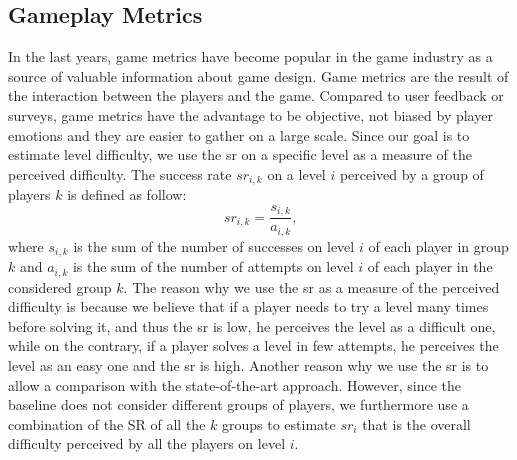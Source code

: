 \subsection{Gameplay Metrics}
In the last years, game metrics have become popular in the game industry as a source of valuable information about game design. Game metrics are the result of the interaction between the players and the game. Compared to user feedback or surveys, game metrics have the advantage to be objective, not biased by player emotions and they are easier to gather on a large scale. Since our goal is to estimate level difficulty, we use the \acs{sr} on a specific level as a measure of the perceived difficulty. The success rate $sr_{i,k}$ on a level $i$ perceived by a group of players $k$ is defined as follow:
\begin{equation}
 sr_{i,k}= \frac{s_{i,k}}{a_{i,k}} \text{,}
\end{equation}
 \label{eq:sucess_rate}
where $s_{i,k}$ is the sum of the number of successes on level $i$ of each player in group $k$ and $a_{i,k}$ is the sum of the number of attempts on level $i$ of each player in the considered group $k$. The reason why we use the \acs{sr} as a measure of the perceived difficulty is because we believe that if a player needs to try a level many times before solving it, and thus the \acs{sr} is low, he perceives the level as a difficult one, while on the contrary, if a player solves a level in few attempts, he perceives the level as an easy one and the \acs{sr} is high. Another reason why we use the \acs{sr} is to allow a comparison with the state-of-the-art approach. However, since the baseline does not consider different groups of players, we furthermore use a combination of the SR of all the $k$ groups to estimate $sr_{i}$ that is the overall difficulty perceived by all the players on level $i$.

